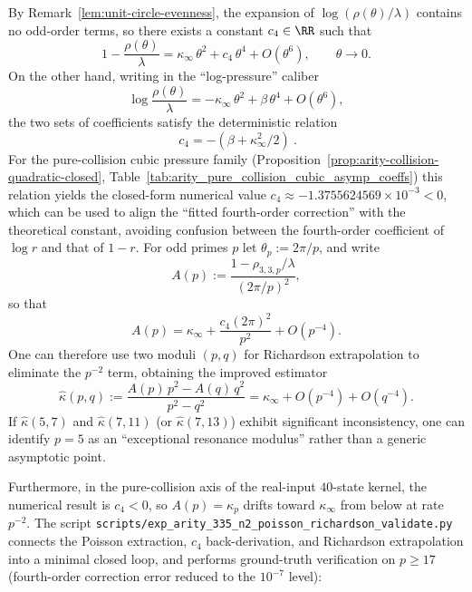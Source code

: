 \begin{remark}\label{rem:arity-335-richardson-kappa}
By Remark~\ref{lem:unit-circle-evenness}, the expansion of $\log(\rho(\theta)/\lambda)$ contains no odd-order terms, so there exists a constant $c_4\in\RR$ such that
\[
1-\frac{\rho(\theta)}{\lambda}
=\kappa_\infty\,\theta^2+c_4\,\theta^4+O(\theta^6),
\qquad \theta\to 0.
\]
On the other hand, writing in the ``log-pressure'' caliber
\[
\log\frac{\rho(\theta)}{\lambda}
=-\kappa_\infty\,\theta^2+\beta\,\theta^4+O(\theta^6),
\]
the two sets of coefficients satisfy the deterministic relation
\[
\boxed{\ c_4=-(\beta+\kappa_\infty^2/2)\ }.
\]
For the pure-collision cubic pressure family (Proposition~\ref{prop:arity-collision-quadratic-closed}, Table~\ref{tab:arity_pure_collision_cubic_asymp_coeffs}) this relation yields the closed-form numerical value
\(
c_4\approx -1.3755624569\times 10^{-3}<0
\),
which can be used to align the ``fitted fourth-order correction'' with the theoretical constant, avoiding confusion between the fourth-order coefficient of \(\log r\) and that of \(1-r\).
For odd primes $p$ let $\theta_p:=2\pi/p$, and write
\[
A(p):=\frac{1-\rho_{3,3,p}/\lambda}{(2\pi/p)^2},
\]
so that
\[
A(p)=\kappa_\infty+\frac{c_4(2\pi)^2}{p^2}+O(p^{-4}).
\]
One can therefore use two moduli $(p,q)$ for Richardson extrapolation to eliminate the $p^{-2}$ term, obtaining the improved estimator
\[
\widehat\kappa(p,q)
:=\frac{A(p)\,p^2-A(q)\,q^2}{p^2-q^2}
=\kappa_\infty+O(p^{-4})+O(q^{-4}).
\]
If $\widehat\kappa(5,7)$ and $\widehat\kappa(7,11)$ (or $\widehat\kappa(7,13)$) exhibit significant inconsistency,
one can identify $p=5$ as an ``exceptional resonance modulus'' rather than a generic asymptotic point.
\par
Furthermore, in the pure-collision axis of the real-input $40$-state kernel, the numerical result is \(c_4<0\), so
\(A(p)=\kappa_p\) drifts toward \(\kappa_\infty\) from below at rate \(p^{-2}\).
The script \texttt{scripts/exp\_arity\_335\_n2\_poisson\_richardson\_validate.py} connects the Poisson extraction,
\(c_4\) back-derivation, and Richardson extrapolation into a minimal closed loop, and performs ground-truth verification on \(p\ge 17\) (fourth-order correction error reduced to the \(10^{-7}\) level):

\end{remark}

